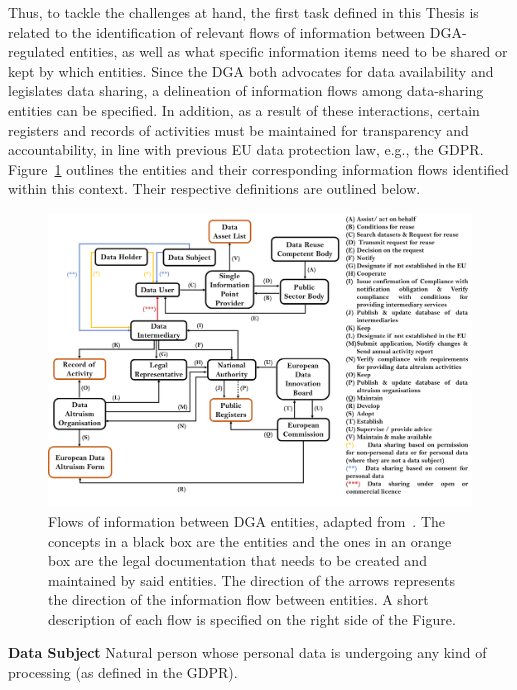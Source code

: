 Thus, to tackle the challenges at hand, the first task defined in this Thesis is related to the identification of relevant flows of information between DGA-regulated entities, as well as what specific information items need to be shared or kept by which entities.
Since the DGA both advocates for data availability and legislates data sharing, a delineation of information flows among data-sharing entities can be specified.
In addition, as a result of these interactions, certain registers and records of activities must be maintained for transparency and accountability, in line with previous EU data protection law, e.g., the GDPR.
Figure~\ref{fig:dga_flow} outlines the entities and their corresponding information flows identified within this context.
Their respective definitions are outlined below.

\begin{figure}[ht]
\centering
\includegraphics[width=\textwidth]{figures/chapter-7/information-flows.png}
\caption[Flows of information between DGA entities.]{Flows of information between DGA entities, adapted from~\cite{esteves_semantics_2023}. The concepts in a black box are the entities and the ones in an orange box are the legal documentation that needs to be created and maintained by said entities. The direction of the arrows represents the direction of the information flow between entities. A short description of each flow is specified on the right side of the Figure.}
\label{fig:dga_flow}
\end{figure}

\textbf{Data Subject} Natural person whose personal data is undergoing any kind of processing (as defined in the GDPR).

